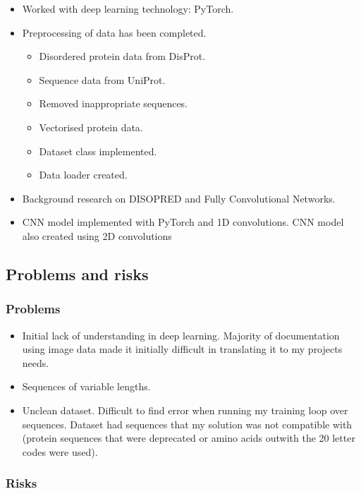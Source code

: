 \documentclass[11pt]{article}
\begin{document}
\begin{itemize}
    \item{Worked with deep learning technology: PyTorch.}
    \item{Preprocessing of data has been completed.}
    \begin{itemize}
        \item{Disordered protein data from DisProt.}
        \item{Sequence data from UniProt.}
        \item{Removed inappropriate sequences.}
        \item{Vectorised protein data.}
        \item{Dataset class implemented.}
        \item{Data loader created.}
    \end{itemize}
    \item{Background research on DISOPRED and Fully Convolutional Networks.}
    \item{CNN model implemented with PyTorch and 1D convolutions. CNN model also created using 2D convolutions}
\end{itemize}

\subsection{Problems and risks}\label{problems-and-risks}

\subsubsection{Problems}\label{problems}

\begin{itemize}
    \item{Initial lack of understanding in deep learning. Majority of documentation using image data made it initially difficult in translating it to my projects needs.}
    \item{Sequences of variable lengths.}
    \item{Unclean dataset. Difficult to find error when running my training loop over sequences. Dataset had sequences that my solution was not compatible with (protein sequences that were deprecated or amino acids outwith the 20 letter codes were used).}
\end{itemize}

\subsubsection{Risks}\label{risks}
\end{document}
